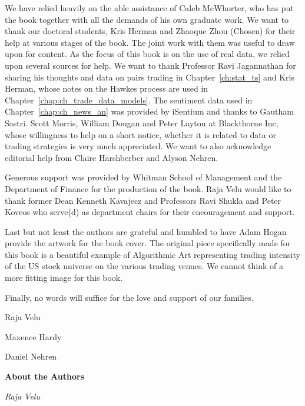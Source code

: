 We have relied heavily on the able assistance of Caleb McWhorter, who has put the book together with all the demands of his own graduate work. We want to thank our doctoral students, Kris Herman and Zhaoque Zhou (Chosen) for their help at various stages of the book. The joint work with them was useful to draw upon for content. As the focus of this book is on the use of real data, we relied upon several sources for help. We want to thank Professor Ravi Jagannathan for sharing his thoughts and data on pairs trading in Chapter~\ref{ch:stat_ts} and Kris Herman, whose notes on the Hawkes process are used in Chapter~\ref{chap:ch_trade_data_models}. The sentiment data used in Chapter~\ref{chap:ch_news_an} was provided by iSentium and thanks to Gautham Sastri. Scott Morris, William Dougan and Peter Layton at Blackthorne Inc, whose willingness to help on a short notice, whether it is related to data or trading strategies is very much appreciated. We want to also acknowledge editorial help from Claire Harshberber and Alyson Nehren. 


Generous support was provided by Whitman School of Management and the Department of Finance for the production of the book. Raja Velu would like to thank former Dean Kenneth Kavajecz and Professors Ravi Shukla and Peter Koveos who serve(d) as department chairs for their encouragement and support.

Last but not least the authors are grateful and humbled to have Adam Hogan provide the artwork for the book cover. The original piece specifically made for this book is a beautiful example of  Algorithmic Art representing trading intensity of the US stock universe on the various trading venues. We cannot think of a more fitting image for this book.  


Finally, no words will suffice for the love and support of our families. \vspace{3\baselineskip}


\noindent Raja Velu \par
\noindent Maxence Hardy \par
\noindent Daniel Nehren



\newpage



{\noindent\Large\bfseries About the Authors} \twomedskip

{\noindent\large\itshape Raja Velu} \medbreak

